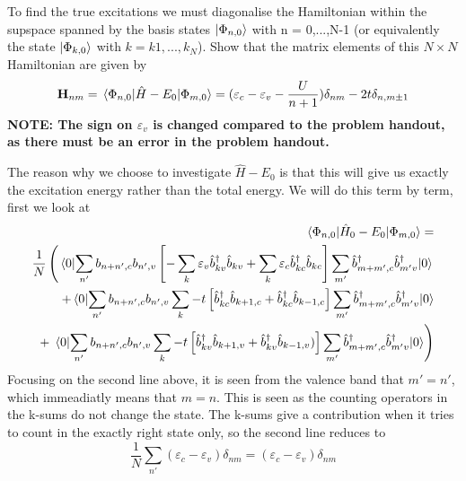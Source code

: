 \begin{exercise}
To find the true excitations we must diagonalise the Hamiltonian within the supspace spanned by the basis states $|\Phi_{n,0}\rangle$ with n = 0,...,N-1 (or equivalently the state $|\Phi_{k,0}\rangle$ with $k = k1,...,k_N$). Show that the matrix elements of this $N \times N$ Hamiltonian are given by
\begin{equation}
    \mathbf{H}_{nm} = \mel{\Phi_{n,0}}{\hat{H}-E_0}{\Phi_{m,0}} = (\varepsilon_c-\varepsilon_v - \frac{U}{n+1})\delta_{nm} - 2 t \delta_{n,m\pm1}
\end{equation}
\textbf{NOTE: The sign on $\varepsilon_v$ is changed compared to the problem handout, as there must be an error in the problem handout.}
\end{exercise}


\begin{solution}
 The reason why we choose to investigate $\hat{H} - E_0$ is that this will give us exactly the excitation energy rather than the total energy. We will do this term by term, first we look at
 \begin{equation}
    \begin{split}
     \mel{\Phi_{n,0}}{\hat{H}_0-E_0}{\Phi_{m,0}} =  \\
     \frac{1}{N}\left(\mel{0}{\sum_{n'}b_{n+n',c}b_{n',v} \left[ -\sum_k \varepsilon_v \hat{b}_{kv}^{\dagger} \hat{b}_{kv}   + \sum_k \varepsilon_c  \hat{b}_{kc}^{\dagger} \hat{b}_{kc}\right]  \sum_{m'} \hat{b}_{m+m',c}^{\dagger} \hat{b}_{m'v}^{\dagger}}{0}\right. \\
     + 
     \mel{0}{\sum_{n'}b_{n+n',c}b_{n',v}  \sum_k - t\left[\hat{b}_{kc}^{\dagger} \hat{b}_{k+1,c} + \hat{b}_{kc}^{\dagger} \hat{b}_{k-1,c}\right] \sum_{m'} \hat{b}_{m+m',c}^{\dagger} \hat{b}_{m'v}^{\dagger}}{0} \\
     +  \left.\mel{0}{\sum_{n'}b_{n+n',c}b_{n',v}  \sum_k - t\left[\hat{b}_{kv}^{\dagger} \hat{b}_{k+1,v} + \hat{b}_{kv}^{\dagger} \hat{b}_{k-1,v})\right] \sum_{m'} \hat{b}_{m+m',c}^{\dagger} \hat{b}_{m'v}^{\dagger}}{0}\right)
    \end{split}
 \end{equation}
 Focusing on the second line above, it is seen from the valence band that $m'=n'$, which immeadiatly means that $m=n$. This is seen as the counting operators in the k-sums do not change the state. The k-sums give a contribution when it tries to count in the exactly right state only, so the second line reduces to
 \begin{equation}
     \frac{1}{N} \sum_{n'} (\varepsilon_c - \varepsilon_v) \delta_{nm} = (\varepsilon_c - \varepsilon_v) \delta_{nm}
     \label{eq:direct}

\end{equation}
\end{solution}
